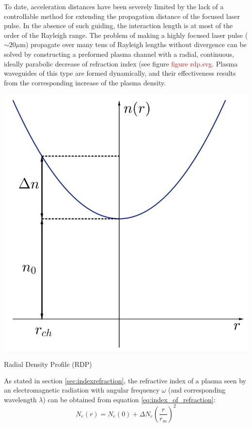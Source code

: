 \documentclass[justified,nofonts,nobib]{tufte-book}
\begin{document}
To date, acceleration distances have been severely limited by the lack of a controllable method for extending the propagation distance of the focused laser pulse. In the absence of such guiding, the interaction length is at most of the order of the Rayleigh range. The problem of making a highly
focused laser pulse ($\sim 20 \mu$m) propagate over many tens of Rayleigh lengths without divergence can be solved by constructing a preformed plasma channel with a radial, continuous, ideally parabolic decrease of refraction index (see figure \textcolor{red}{figure rdp.svg}. Plasma waveguides of this type are formed dynamically, and their effectiveness
results from the corresponding increase of the plasma density.
\begin{marginfigure}
    \includegraphics[width=\marginparwidth]{figures/rdp.PNG}
    \caption{Radial Density Profile (RDP)}
    \label{fig:rdp_parabola}
\end{marginfigure}
As stated in section \ref{sec:indexrefraction}, the refractive index of a plasma seen by an electromagnetic radiation with angular frequency $\omega$ (and corresponding wavelength $\lambda$) can be obtained from equation \ref{eq:index_of_refraction}:
\begin{equation} \label{eq:index_refraction_approx}
N_e(r)=N_e(0)+\Delta N_e\left( \frac{r}{r_m}\right)^2
\end{equation}
\end{document}

